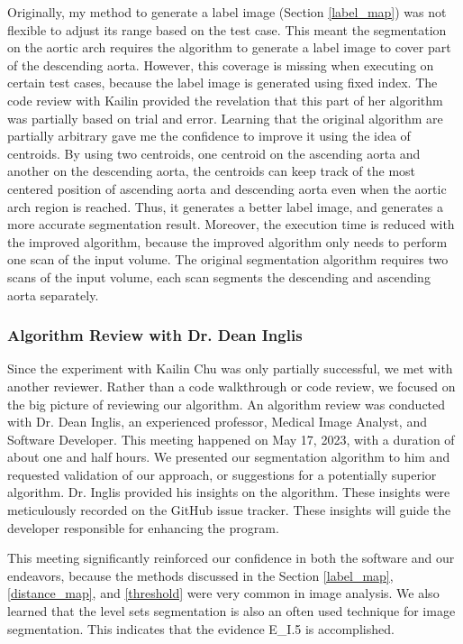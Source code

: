 Originally, my method to generate a label image (Section \ref{label_map}) was not flexible to adjust its range based on the test case. This meant the segmentation on the aortic arch requires the algorithm to generate a label image to cover part of the descending aorta. However, this coverage is missing when executing on certain test cases, because the label image is generated using fixed index. The code review with Kailin provided the revelation that this part of her algorithm was partially based on trial and error. Learning that the original algorithm are partially arbitrary gave me the confidence to improve it using the idea of centroids. By using two centroids, one centroid on the ascending aorta and another on the descending aorta, the centroids can keep track of the most centered position of ascending aorta and descending aorta even when the aortic arch region is reached. Thus, it generates a better label image, and generates a more accurate segmentation result. Moreover, the execution time is reduced with the improved algorithm, because the improved algorithm only needs to perform one scan of the input volume. The original segmentation algorithm requires two scans of the input volume, each scan segments the descending and ascending aorta separately.

\subsubsection{Algorithm Review with Dr. Dean Inglis}

Since the experiment with Kailin Chu was only partially successful, we met with another reviewer. Rather than a code walkthrough or code review, we focused on the big picture of reviewing our algorithm. An algorithm review was conducted with Dr. Dean Inglis, an experienced professor, Medical Image Analyst, and Software Developer. This meeting happened on May 17, 2023, with a duration of about one and half hours. We presented our segmentation algorithm to him and requested validation of our approach, or suggestions for a potentially superior algorithm. Dr. Inglis provided his insights on the algorithm. These insights were meticulously recorded on the GitHub issue tracker. These insights will guide the developer responsible for enhancing the program.

This meeting significantly reinforced our confidence in both the software and our endeavors, because the methods discussed in the Section \ref{label_map}, \ref{distance_map}, and \ref{threshold} were very common in image analysis. We also learned that the level sets segmentation is also an often used technique for image segmentation. This indicates that the evidence E\_I.5 is accomplished.

